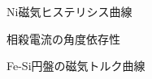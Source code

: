 \documentclass[uplatex,a4j,11pt,dvipdfmx]{jsarticle}
\begin{document}
%
%
%
%
%
%

\begin{figure}
  \begin{center}
    
    \caption{Ni磁気ヒステリシス曲線}
  \end{center}
\end{figure}

\begin{figure}
  \begin{center}
    
    \caption{相殺電流の角度依存性}
  \end{center}
\end{figure}

\begin{figure}
  \begin{center}
    
    \caption{Fe-Si円盤の磁気トルク曲線}
  \end{center}
\end{figure}

\begin{figure}
  \begin{center}
    
  \end{center}
\end{figure}


\end{document}
